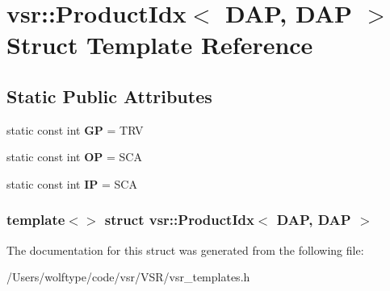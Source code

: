 \hypertarget{structvsr_1_1_product_idx_3_01_d_a_p_00_01_d_a_p_01_4}{\section{vsr\-:\-:Product\-Idx$<$ D\-A\-P, D\-A\-P $>$ Struct Template Reference}
\label{structvsr_1_1_product_idx_3_01_d_a_p_00_01_d_a_p_01_4}
}
\subsection*{Static Public Attributes}
\begin{DoxyCompactItemize}
\item 
\hypertarget{structvsr_1_1_product_idx_3_01_d_a_p_00_01_d_a_p_01_4_a298be351c1301a05fdcac1847dfb849c}{static const int {\bfseries G\-P} = T\-R\-V}\label{structvsr_1_1_product_idx_3_01_d_a_p_00_01_d_a_p_01_4_a298be351c1301a05fdcac1847dfb849c}

\item 
\hypertarget{structvsr_1_1_product_idx_3_01_d_a_p_00_01_d_a_p_01_4_ad9a6bb3297d055adfee940fc7d4484a4}{static const int {\bfseries O\-P} = S\-C\-A}\label{structvsr_1_1_product_idx_3_01_d_a_p_00_01_d_a_p_01_4_ad9a6bb3297d055adfee940fc7d4484a4}

\item 
\hypertarget{structvsr_1_1_product_idx_3_01_d_a_p_00_01_d_a_p_01_4_a78988eaeb79891859360ef6a13a4c3d3}{static const int {\bfseries I\-P} = S\-C\-A}\label{structvsr_1_1_product_idx_3_01_d_a_p_00_01_d_a_p_01_4_a78988eaeb79891859360ef6a13a4c3d3}

\end{DoxyCompactItemize}
\subsubsection*{template$<$$>$ struct vsr\-::\-Product\-Idx$<$ D\-A\-P, D\-A\-P $>$}



The documentation for this struct was generated from the following file\-:\begin{DoxyCompactItemize}
\item 
/\-Users/wolftype/code/vsr/\-V\-S\-R/vsr\-\_\-templates.\-h\end{DoxyCompactItemize}
